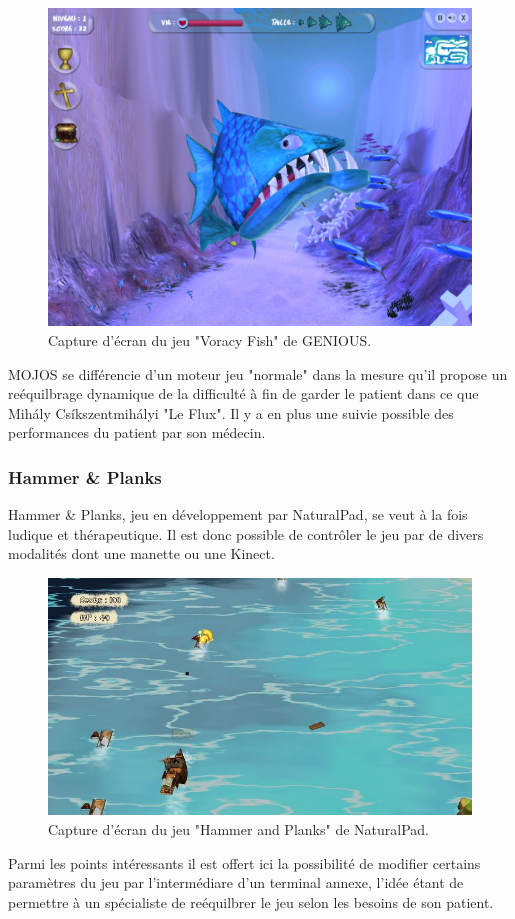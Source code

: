 \begin{figure}[h!]
\centering
\includegraphics[width=0.8\linewidth]{images/voracy_fish}
\caption{Capture d'écran du jeu "Voracy Fish" de GENIOUS.}
\label{fig:voracy_fish}
\end{figure}

MOJOS se différencie d'un moteur jeu "normale" dans la mesure qu'il propose
un reéquilbrage dynamique de la difficulté à fin de garder le patient dans
ce que Mihály Csíkszentmihályi "Le Flux". Il y a en plus une suivie possible 
des performances du patient par son médecin.


\subsubsection{Hammer \& Planks}
Hammer \& Planks, jeu en développement par NaturalPad, se veut à la fois 
ludique et thérapeutique. Il est donc possible de contrôler le jeu par de divers 
modalités dont une manette ou une Kinect.

\begin{figure}[h!]
\centering
\includegraphics[width=1.0\linewidth]{images/hammer_and_planks}
\caption{Capture d'écran du jeu "Hammer and Planks" de 
NaturalPad.}
\end{figure}

Parmi les points intéressants il est offert ici la possibilité de modifier certains
paramètres du jeu par l'intermédiare d'un terminal annexe, l'idée étant de
permettre à un spécialiste de reéquilbrer le jeu selon les besoins de son
patient.
